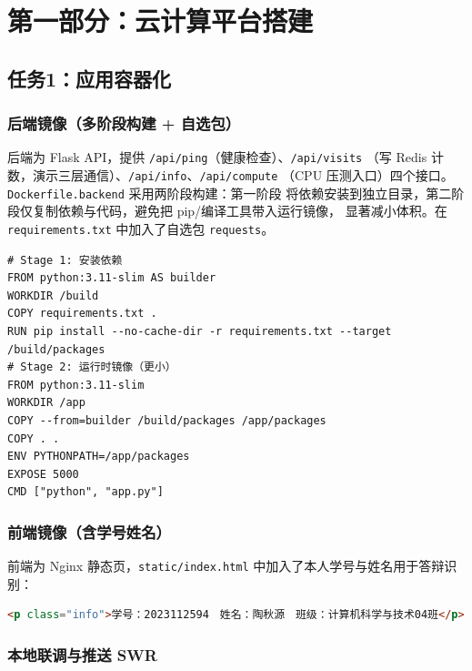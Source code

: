 \chapter{第一部分：云计算平台搭建}

\section{任务1：应用容器化}

\subsection{后端镜像（多阶段构建 + 自选包）}

后端为 Flask API，提供 \lstinline!/api/ping!（健康检查）、\lstinline!/api/visits!
（写 Redis 计数，演示三层通信）、\lstinline!/api/info!、\lstinline!/api/compute!
（CPU 压测入口）四个接口。\lstinline!Dockerfile.backend! 采用两阶段构建：第一阶段
将依赖安装到独立目录，第二阶段仅复制依赖与代码，避免把 pip/编译工具带入运行镜像，
显著减小体积。在 \lstinline!requirements.txt! 中加入了自选包 \lstinline!requests!。

\begin{lstlisting}[language=Docker,caption={Dockerfile.backend（多阶段构建）},captionpos=b]
# Stage 1: 安装依赖
FROM python:3.11-slim AS builder
WORKDIR /build
COPY requirements.txt .
RUN pip install --no-cache-dir -r requirements.txt --target /build/packages
# Stage 2: 运行时镜像（更小）
FROM python:3.11-slim
WORKDIR /app
COPY --from=builder /build/packages /app/packages
COPY . .
ENV PYTHONPATH=/app/packages
EXPOSE 5000
CMD ["python", "app.py"]
\end{lstlisting}

\subsection{前端镜像（含学号姓名）}

前端为 Nginx 静态页，\lstinline!static/index.html! 中加入了本人学号与姓名用于答辩识别：
\begin{lstlisting}[language=HTML,caption={index.html 关键行},captionpos=b]
<p class="info">学号：2023112594　姓名：陶秋源　班级：计算机科学与技术04班</p>
\end{lstlisting}

\subsection{本地联调与推送 SWR}


